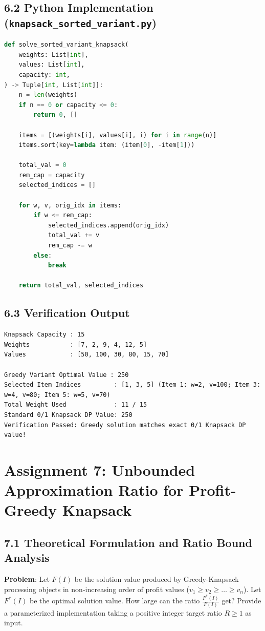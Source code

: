 \documentclass[12pt]{article}
\begin{document}
\subsection*{6.2 Python Implementation (\texttt{knapsack\_sorted\_variant.py})}
\begin{lstlisting}[language=Python]
def solve_sorted_variant_knapsack(
    weights: List[int],
    values: List[int],
    capacity: int,
) -> Tuple[int, List[int]]:
    n = len(weights)
    if n == 0 or capacity <= 0:
        return 0, []

    items = [(weights[i], values[i], i) for i in range(n)]
    items.sort(key=lambda item: (item[0], -item[1]))

    total_val = 0
    rem_cap = capacity
    selected_indices = []

    for w, v, orig_idx in items:
        if w <= rem_cap:
            selected_indices.append(orig_idx)
            total_val += v
            rem_cap -= w
        else:
            break

    return total_val, selected_indices
\end{lstlisting}

\subsection*{6.3 Verification Output}
\begin{lstlisting}
Knapsack Capacity : 15
Weights           : [7, 2, 9, 4, 12, 5]
Values            : [50, 100, 30, 80, 15, 70]

Greedy Variant Optimal Value : 250
Selected Item Indices         : [1, 3, 5] (Item 1: w=2, v=100; Item 3: w=4, v=80; Item 5: w=5, v=70)
Total Weight Used             : 11 / 15
Standard 0/1 Knapsack DP Value: 250
Verification Passed: Greedy solution matches exact 0/1 Knapsack DP value!
\end{lstlisting}

\newpage

\section*{Assignment 7: Unbounded Approximation Ratio for Profit-Greedy Knapsack}

\subsection*{7.1 Theoretical Formulation and Ratio Bound Analysis}
\textbf{Problem}: Let $F(I)$ be the solution value produced by Greedy-Knapsack processing objects in non-increasing order of profit values ($v_1 \ge v_2 \ge \dots \ge v_n$). Let $F^*(I)$ be the optimal solution value. How large can the ratio $\frac{F^*(I)}{F(I)}$ get? Provide a parameterized implementation taking a positive integer target ratio $R \ge 1$ as input.
\end{document}
